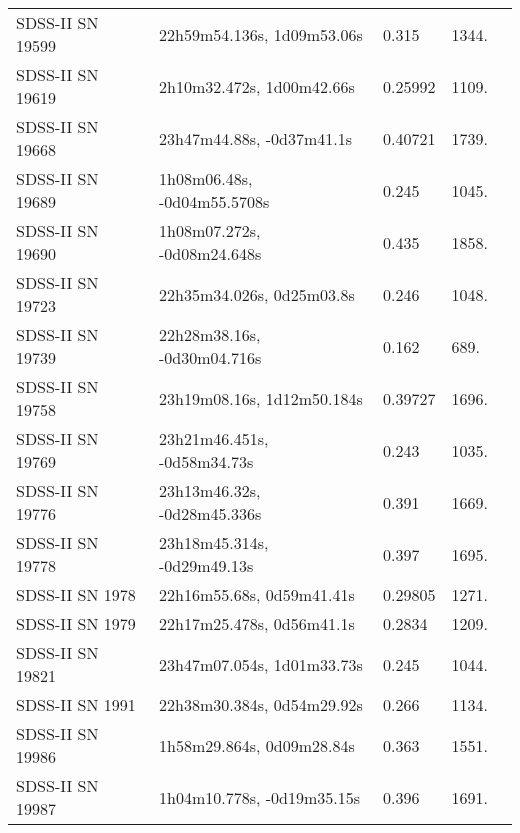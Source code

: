 \begin{longtable}{lllll}
 SDSS-II SN 19599 &     22h59m54.136s, 1d09m53.06s &    0.315 &          1344. &    \citet{2011ApJ...738..162S} \\
 SDSS-II SN 19619 &      2h10m32.472s, 1d00m42.66s &  0.25992 &          1109. &    \citet{2016SDSSD.C...0000:} \\
 SDSS-II SN 19668 &      23h47m44.88s, -0d37m41.1s &  0.40721 &          1739. &    \citet{2016SDSSD.C...0000:} \\
 SDSS-II SN 19689 &    1h08m06.48s, -0d04m55.5708s &    0.245 &          1045. &    \citet{2011ApJ...738..162S} \\
 SDSS-II SN 19690 &    1h08m07.272s, -0d08m24.648s &    0.435 &          1858. &    \citet{2011ApJ...738..162S} \\
 SDSS-II SN 19723 &      22h35m34.026s, 0d25m03.8s &    0.246 &          1048. &    \citet{2011ApJ...738..162S} \\
 SDSS-II SN 19739 &    22h28m38.16s, -0d30m04.716s &    0.162 &           689. &    \citet{2011ApJ...738..162S} \\
 SDSS-II SN 19758 &     23h19m08.16s, 1d12m50.184s &  0.39727 &          1696. &    \citet{2016SDSSD.C...0000:} \\
 SDSS-II SN 19769 &    23h21m46.451s, -0d58m34.73s &    0.243 &          1035. &    \citet{2011ApJ...738..162S} \\
 SDSS-II SN 19776 &    23h13m46.32s, -0d28m45.336s &    0.391 &          1669. &    \citet{2011ApJ...738..162S} \\
 SDSS-II SN 19778 &    23h18m45.314s, -0d29m49.13s &    0.397 &          1695. &    \citet{2003AJ....126.2125Z} \\
  SDSS-II SN 1978 &      22h16m55.68s, 0d59m41.41s &  0.29805 &          1271. &    \citet{2016SDSSD.C...0000:} \\
  SDSS-II SN 1979 &      22h17m25.478s, 0d56m41.1s &   0.2834 &          1209. &  \citet{2009AandA...495...53L} \\
 SDSS-II SN 19821 &     23h47m07.054s, 1d01m33.73s &    0.245 &          1044. &    \citet{2010ApJ...713.1026D} \\
  SDSS-II SN 1991 &     22h38m30.384s, 0d54m29.92s &    0.266 &          1134. &    \citet{2011ApJ...738..162S} \\
 SDSS-II SN 19986 &      1h58m29.864s, 0d09m28.84s &    0.363 &          1551. &    \citet{2010ApJ...713.1026D} \\
 SDSS-II SN 19987 &     1h04m10.778s, -0d19m35.15s &    0.396 &          1691. &    \citet{2011ApJ...738..162S} \\

\end{longtable}
